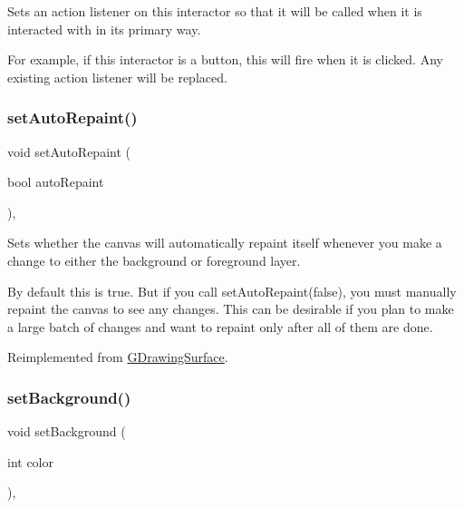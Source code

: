 Sets an action listener on this interactor so that it will be called when it is interacted with in its primary way. 

For example, if this interactor is a button, this will fire when it is clicked. Any existing action listener will be replaced. \mbox{\label{classGCanvas_acb65220cc16d17df02a0c08d35b60988}} 
\subsubsection{\texorpdfstring{set\+Auto\+Repaint()}{setAutoRepaint()}}
{\footnotesize\ttfamily void set\+Auto\+Repaint (\begin{DoxyParamCaption}\item[{bool}]{auto\+Repaint }\end{DoxyParamCaption})\hspace{0.3cm}{\ttfamily [override]}, {\ttfamily [virtual]}}



Sets whether the canvas will automatically repaint itself whenever you make a change to either the background or foreground layer. 

By default this is true. But if you call set\+Auto\+Repaint(false), you must manually repaint the canvas to see any changes. This can be desirable if you plan to make a large batch of changes and want to repaint only after all of them are done. 

Reimplemented from \mbox{\hyperlink{classGDrawingSurface_adf10848319457bd6df4c657bf8872bee}{G\+Drawing\+Surface}}.

\mbox{\label{classGCanvas_a10d305826534b55561ea88730fc9f6cd}} 
\subsubsection{\texorpdfstring{set\+Background()}{setBackground()}\hspace{0.1cm}{\footnotesize\ttfamily [1/2]}}
{\footnotesize\ttfamily void set\+Background (\begin{DoxyParamCaption}\item[{int}]{color }\end{DoxyParamCaption})\hspace{0.3cm}{\ttfamily [override]}, {\ttfamily [virtual]}}



